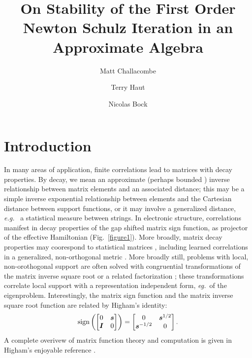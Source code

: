 \documentclass[letterpaper,twocolumn,amsmath,amsfont,amssymb,english,aps,jcp,preprintnumbers,groupaddress,nofootinbib,tightenlines]{revtex4}
\newcommand{\mat}[1]{\boldsymbol{#1}}
\begin{document}
\title{On Stability of the First Order Newton Schulz Iteration in an Approximate Algebra}

\author{Matt Challacombe}

\author{Terry Haut}


\author{Nicolas Bock}


\maketitle
\section{Introduction}

In many areas of application, finite correlations lead to matrices with decay properties.  By decay, we mean an approximate 
(perhaps bounded \cite{}) inverse relationship between matrix elements and an associated distance;  this may be a simple inverse 
exponential relationship between elements and the Cartesian distance between support functions, or it may 
involve a generalized distance, {\em e.g.}~ a statistical measure between strings.  
In electronic structure,  correlations manifest in decay properties of the gap shifted matrix 
sign function, as projector of the effective Hamiltonian (Fig.~\ref{figure1}).  
More broadly, matrix decay properties may coorespond to statistical matrices 
\cite{penrose1974,voit00,Anselin2003,Hardin2013,Krishtal2014}, including learned correlations in a 
generalized, non-orthogonal metric \cite{}. More broadly still, problems with local, non-orothogonal support 
are often solved with congruential transformations of the matrix inverse 
square root \cite{Lowdin56,naidu11} or a related factorization \cite{Krishtal2014};
these transformations correlate local support with a representation independent form, {\em eg.}~of the eigenproblem. 
Interestingly, the matrix sign function and the matrix inverse square root function are related by Higham's identity:
\begin{equation}
\rm{sign} \left( \begin{bmatrix} 0 & \mat{s}      \\ \mat{I}       & 0\end{bmatrix} \right)  =
                 \begin{bmatrix} 0 & \mat{s}^{1/2} \\ \mat{s}^{-1/2} & 0\end{bmatrix}  .
\end{equation}
A complete overivew of matrix function theory and computation is given in Higham's enjoyable reference \cite{Higham08}. 
\end{document}
